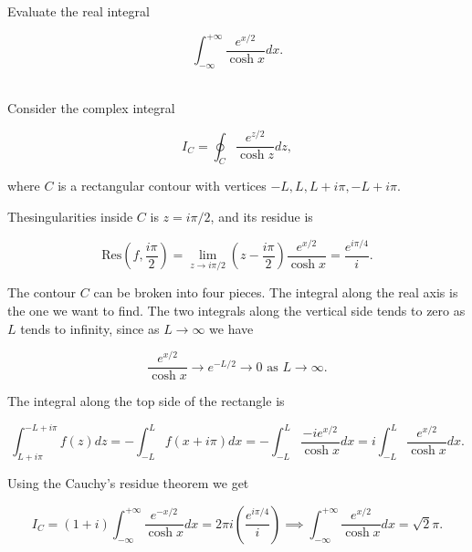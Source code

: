 \documentclass[english,a4paper,12pt]{report}
\begin{document}
{Evaluate the real integral

\begin{equation}
    \int_{-\infty}^{+\infty} \frac{e^{x /2} }{\cosh x}dx.  
\end{equation}
~
}
{Consider the complex integral 

\begin{equation}
    I_{C} = \oint_{C} \frac{e^{z /2} }{\cosh z}dz,  
\end{equation}

where \(C\) is a rectangular contour with vertices \(-L,L,L+i\pi ,-L+i\pi \). 

Thesingularities inside \(C\) is \(z = i\pi /2\), and its residue is 

\begin{equation}
    \text{Res}\left( f, \frac{i\pi }{2}  \right) = \lim_{z \to i\pi /2} \left( z - \frac{i\pi }{2}  \right) \frac{e^{x /2} }{\cosh x} = \frac{e^{i \pi /4} }{i} .
\end{equation}

The contour \(C\) can be broken into four pieces. The integral along the real axis is the one we want to find. The two integrals along the vertical side tends to zero as \(L\) tends to infinity, since as \(L \to \infty\) we have 

\begin{equation}
    \frac{e^{x /2} }{\cosh x} \to e^{-L/2} \to 0 \text{ as } L \to \infty.  
\end{equation}

The integral along the top side of the rectangle is 

\begin{equation}
    \int_{L+i\pi }^{-L+i\pi } f(z)dz = -\int_{-L}^{L} f(x+i\pi )dx = -\int_{-L}^{L} \frac{-i e^{x /2} }{\cosh x} dx = i \int_{-L}^{L} \frac{e^{x /2} }{\cosh x}dx.          
\end{equation}

Using the Cauchy's residue theorem we get 

\begin{equation}
    I_{C} = (1+i) \int_{-\infty}^{+\infty} \frac{e^{-x /2} }{\cosh x}dx = 2\pi i \left( \frac{e^{i \pi /4} }{i}  \right) \implies \int_{-\infty}^{+\infty} \frac{e^{x /2} }{\cosh x}dx = \sqrt{2}\pi .   
\end{equation}
~
} 
\end{document}
